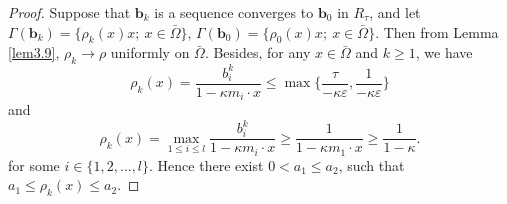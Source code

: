 \documentclass[a4paper,12pt,]{article}
\numberwithin{equation}{section}
\numberwithin{equation}{section} \allowdisplaybreaks
\begin{document}
\begin{proof}
  Suppose that $\mathbf{b}_{k}$ is a sequence converges to $\mathbf{b}_{0}$ in $R_{\tau}$, and let $\Gamma(\mathbf{b}_{k}) = \{\rho_{k}(x)x;~x\in \bar{\Omega}\}$, $\Gamma(\mathbf{b}_{0}) = \{\rho_{0}(x)x;~x\in \bar{\Omega}\}$. Then from Lemma \ref{lem3.9}, $\rho_{k} \rightarrow \rho$ uniformly on $\bar{\Omega}$. Besides, for any $x\in \bar{\Omega}$ and $k \geq 1$, we have
  $$\rho_{k}(x) = \frac{b_{i}^{k}}{1 - \kappa m_{i} \cdot x} \leq \max\{\dfrac{\tau}{-\kappa \varepsilon}, \dfrac{1}{-\kappa \varepsilon}\}$$
  and
  $$\rho_{k}(x) = \max_{1 \leq i \leq l}\frac{b_{i}^{k}}{1 - \kappa m_{i} \cdot x} \geq \frac{1}{1 - \kappa m_{1} \cdot x} \geq\frac{1}{1 - \kappa}.$$
  for some $i \in \{1,2,\ldots,l\}$. Hence there exist $0 < a_{1} \leq a_{2}$, such that $ a_{1} \leq \rho_{k}(x) \leq  a_{2}$.


\end{proof}
\end{document}
